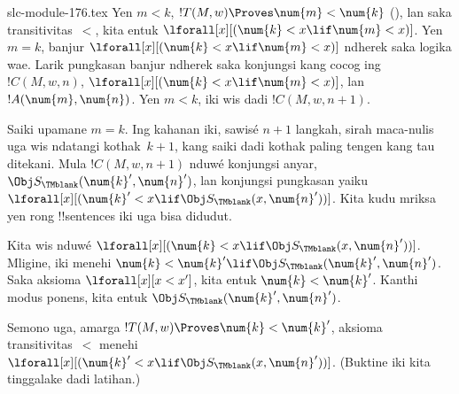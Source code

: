 \begin{filecontents*}[overwrite]{slc-module-176.tex}
Yen $m < k$, $!T(M,w) \Proves \num{m} < \num {k}$
(), lan saka transitivitas~$<$,
kita entuk $\lforall[x][(\num{k} < x \lif \num{m} < x)]$.
Yen $m = k$, banjur
$\lforall[x][(\num{k} < x \lif \num{m} < x)]$
ndherek saka logika wae. Larik pungkasan banjur
ndherek saka konjungsi kang cocog ing $!C(M, w, n)$,
$\lforall[x][(\num{k} < x \lif \num{m} < x)]$,
lan $!A(\num{m},\num{n})$. Yen $m<k$,
iki wis dadi $!C(M, w, n+1)$.

Saiki upamane $m=k$. Ing kahanan iki, sawisé
$n+1$ langkah, sirah maca-nulis uga wis
ndatangi kothak~$k+1$, kang saiki dadi
kothak paling tengen kang tau ditekani.
Mula $!C(M, w, n+1)$ nduwé konjungsi anyar,
$\Obj S_\TMblank(\num{k}',\num{n}')$,
lan konjungsi pungkasan yaiku
$\lforall[x][(\num{k}' < x \lif \Obj S_\TMblank(x, \num{n}'))]$.
Kita kudu mriksa yen rong !!{sentence}s
iki uga bisa didudut.

Kita wis nduwé $\lforall[x][(\num{k} < x \lif \Obj S_\TMblank(x,
  \num{n}'))]$. Mligine, iki menehi
$\num{k} < \num{k}' \lif \Obj S_\TMblank(\num{k}', \num{n}')$.
Saka aksioma $\lforall[x][x < x']$,
kita entuk $\num{k} < \num{k}'$.
Kanthi modus ponens, kita entuk
$\Obj S_\TMblank(\num{k}',\num{n}')$.

Semono uga, amarga $!T(M,w) \Proves \num{k} < \num{k}'$,
aksioma transitivitas~$<$ menehi
$\lforall[x][(\num{k}' < x \lif \Obj
  S_\TMblank(x, \num{n}'))]$.
(Buktine iki kita tinggalake dadi latihan.)


\end{filecontents*}
